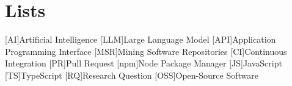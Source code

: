 \documentclass[12pt, a4paper]{book}%
\begin{document}




\appendix

\renewcommand{\appendixtocname}{Appendix}

\renewcommand{\appendixpagename}{\appendixtocname}

\addappheadtotoc


\appendixpage





\chapter{Lists}


\begin{acronym}[\hspace{3cm}]

    [AI]{Artificial Intelligence}
    [LLM]{Large Language Model}
    [API]{Application Programming Interface}
    [MSR]{Mining Software Repositories}
    [CI]{Continuous Integration}
    [PR]{Pull Request}
    [npm]{Node Package Manager}
    [JS]{JavaScript}
    [TS]{TypeScript}
    [RQ]{Research Question}
    [OSS]{Open-Source Software}

\end{acronym}

\clearpage



\listoffigures




\listoftables




\printbibliography[heading=bibintoc, title={References}]


\end{document}
